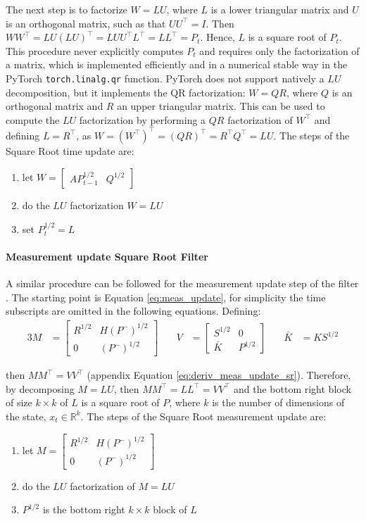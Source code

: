 \documentclass{article}
\begin{document}
The next step is to factorize  $W=LU$, where $L$ is a lower triangular matrix and $U$ is an orthogonal matrix, such as that $UU^\top = I$. Then $WW^\top = LU(LU)^\top = LUU^\top L^\top = LL^\top=P_t$. Hence, $L$ is a square root of $P_t$.
This procedure never explicitly computes $P_t$ and requires only the factorization of a matrix, which is implemented efficiently and in a numerical stable way in the \textsf{PyTorch} \verb|torch.linalg.qr| function. 
PyTorch does not support natively a $LU$ decomposition, but it implements the QR factorization: $W=QR$, where $Q$ is an orthogonal matrix and $R$ an upper triangular matrix. This can be used to compute the $LU$ factorization by performing a $QR$ factorization of $W^\top$ and defining $L = R^\top$, as $W=(W^\top)^\top=(QR)^\top=R^\top Q^\top=LU$.
The steps of the Square Root time update are:

\begin{enumerate}
    \item let  $W = \begin{bmatrix}AP_{t-1}^{1/2} & Q^{1/2}\end{bmatrix}$
    \item do the $LU$ factorization $W=LU$
    \item set $P_t^{1/2} = L$
\end{enumerate}

\paragraph{Measurement update Square Root Filter} A similar procedure can be followed for the measurement update step of the filter \cite{dan_simon_optimal_2006}. The starting point is Equation \ref{eq:meas_update}, for simplicity the time subscripts are omitted in the following equations. Defining:
\begin{alignat*}{3}
    M &= \begin{bmatrix} R^{1/2} & H(P^-)^{1/2} \\ 0 & (P^-)^{1/2} \end{bmatrix} \quad &
    V &= \begin{bmatrix} S^{1/2} & 0 \\ \bar{K} & P^{1/2} \end{bmatrix} \quad&
    \bar{K} &= KS^{1/2}
\end{alignat*}
    
then $MM^\top = VV^\top$ (appendix Equation \ref{eq:deriv_meas_update_sr}). Therefore, by decomposing $M=LU$, then $MM^\top=LL^\top=VV^\top$ and the bottom right block of size $k \times k$ of $L$ is a square root of $P$, where $k$ is the number of dimensions of the state, $x_t \in \mathbb{R}^k$.
The steps of the Square Root measurement update are:
\begin{enumerate}
 \item let $M = \begin{bmatrix} R^{1/2} & H(P^-)^{1/2} \\ 0 & (P^-)^{1/2} \end{bmatrix}$
 \item do the $LU$ factorization of $M=LU$
 \item $P^{1/2}$ is the bottom right $k \times k$ block of $L$
\end{enumerate}
\end{document}
